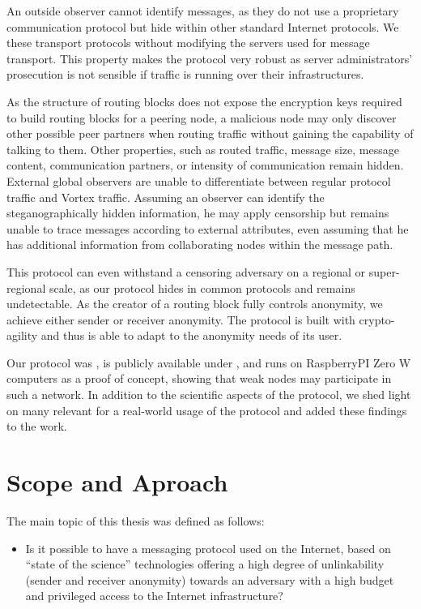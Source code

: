 An outside observer cannot identify messages, as they do not use a proprietary communication protocol but hide within other standard Internet protocols. We  these transport protocols without modifying the servers used for message transport. This property makes the protocol very robust as server administrators' prosecution is not sensible if traffic is running over their infrastructures. 

As the structure of routing blocks does not expose the encryption keys required to build routing blocks for a peering node, a malicious node may only discover other possible peer partners when routing traffic without gaining the capability of talking to them. Other properties, such as routed traffic, message size, message content, communication partners, or intensity of communication remain hidden. External global observers are unable to differentiate between regular protocol traffic and Vortex traffic. Assuming an observer can identify the steganographically hidden information, he may apply censorship but remains unable to trace messages according to external attributes, even assuming that he has additional information from collaborating nodes within the message path.

This protocol can even withstand a censoring adversary on a regional or super-regional scale, as our protocol hides in common protocols and remains undetectable. As the creator of a routing block fully controls anonymity, we achieve either sender or receiver anonymity. The protocol is built with crypto-agility and thus is able to adapt to the anonymity needs of its user.

Our protocol was , is publicly available under \href{https://messagevortex.net/}, and runs on RaspberryPI Zero W computers as a proof of concept, showing that weak nodes may participate in such a network. In addition to the scientific aspects of the protocol, we shed light on many  relevant for a real-world usage of the protocol and added these findings to the work.

\chapter{Scope and Aproach}
The main topic of this thesis was defined as follows:

\begin{itemize}
	\item Is it possible to have a messaging protocol used on the Internet, based on ``state of the science'' technologies offering a high degree of unlinkability (sender and receiver anonymity) towards an adversary with a high budget and privileged access to the Internet infrastructure?
\end{itemize}

